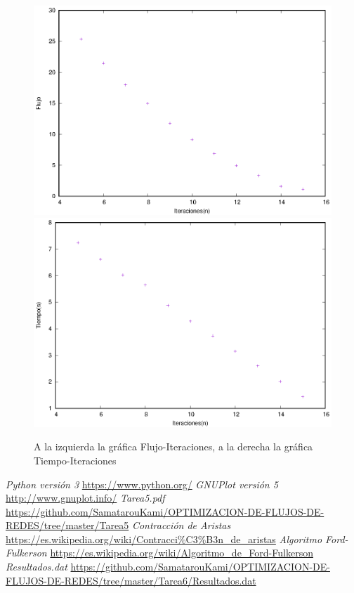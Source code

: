 \documentclass[12pt,letterpaper]{article}
\begin{document}
\begin{figure}[htbp]
\centering
\includegraphics[scale=0.6]{Flujo-Iteraciones}
\includegraphics[scale=0.6]{Tiempo-Iteraciones}
\caption{\small A la izquierda la gráfica Flujo-Iteraciones, a la derecha la gráfica Tiempo-Iteraciones}
\end{figure}




\newpage

\begin{thebibliography}{a}

 \textit{Python versión 3} \url{https://www.python.org/}
 \textit{GNUPlot versión 5} \url{http://www.gnuplot.info/}
 \textit{Tarea5.pdf} \url{https://github.com/SamatarouKami/OPTIMIZACION-DE-FLUJOS-DE-REDES/tree/master/Tarea5}
 \textit{Contracción de Aristas} \url{https://es.wikipedia.org/wiki/Contracci%C3%B3n_de_aristas}
 \textit{Algoritmo Ford-Fulkerson} \url{https://es.wikipedia.org/wiki/Algoritmo_de_Ford-Fulkerson}
 \textit{Resultados.dat} \url{https://github.com/SamatarouKami/OPTIMIZACION-DE-FLUJOS-DE-REDES/tree/master/Tarea6/Resultados.dat}
\end{thebibliography}
\end{document}
